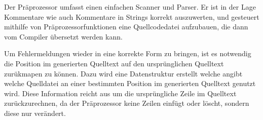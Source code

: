 Der Pr\"aprozessor umfasst einen einfachen Scanner und Parser. Er ist in der Lage Kommentare wie auch Kommentare in Strings korrekt auszuwerten, und gesteuert mithilfe von Pr\"aprozessorfunktionen eine Quellcodedatei aufzubauen, die dann vom Compiler \"ubersetzt werden kann.

Um Fehlermeldungen wieder in eine korrekte Form zu bringen, ist es notwendig die Position im generierten Quelltext auf den urspr\"unglichen Quelltext zur\"ukmapen zu k\"onnen. Dazu wird eine Datenstruktur erstellt welche angibt welche Quelldatei an einer bestimmten Position im generierten Quelltext genutzt wird. Diese Information reicht aus um die urspr\"ungliche Zeile im Quelltext zur\"uckzurechnen, da der Pr\"aprozessor keine Zeilen einf\"ugt oder l\"oscht, sondern diese nur ver\"andert.